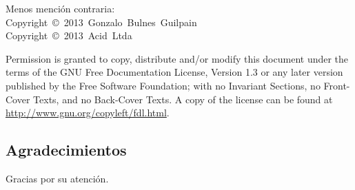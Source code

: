 \begin{frame}{\insertsubsection}
    \scriptsize{Menos mención contraria:}\\
    \noindent\scriptsize{Copyright~\copyright~2013~Gonzalo~Bulnes~Guilpain}\\
    \noindent\scriptsize{Copyright~\copyright~2013~Acid~Ltda}

    \scriptsize{Permission is granted to copy, distribute and/or modify this document
    under the terms of the GNU Free Documentation License, Version 1.3
    or any later version published by the Free Software Foundation;
    with no Invariant Sections, no Front-Cover Texts, and no Back-Cover Texts.
    A copy of the license can be found at \url{http://www.gnu.org/copyleft/fdl.html}.}
  \end{frame}

%
\subsection{Agradecimientos}

  \begin{frame}
    \vspace{0mm}
    \begin{center}
      Gracias por su atención.
    \end{center}
  \end{frame}
